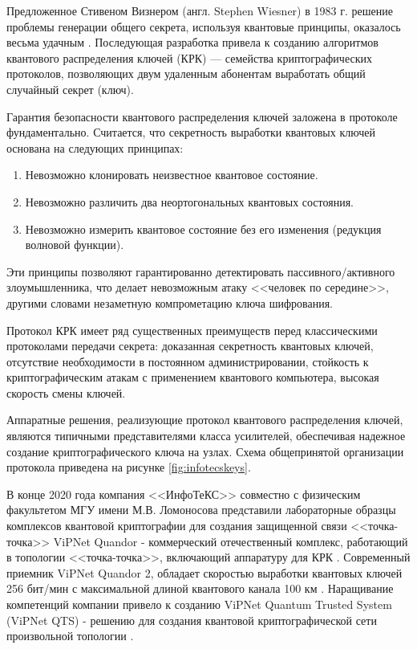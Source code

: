\documentclass[a4paper,12pt]{article}
\begin{document}
Предложенное Стивеном Визнером (англ. Stephen Wiesner) в 1983 г. решение проблемы генерации общего секрета, используя квантовые принципы, оказалось весьма удачным \cite{Stephen_Wiesner}. Последующая разработка привела к созданию алгоритмов квантового распределения ключей (КРК) — семейства криптографических протоколов, позволяющих двум удаленным абонентам выработать общий случайный секрет (ключ). 

Гарантия безопасности квантового распределения ключей заложена в протоколе фундаментально. Считается, что секретность выработки квантовых ключей основана на следующих принципах:

\begin{enumerate}
	\item Невозможно клонировать неизвестное квантовое состояние.
	\item Невозможно различить два неортогональных квантовых состояния.
	\item Невозможно измерить квантовое состояние без его изменения (редукция волновой функции).
\end{enumerate}

Эти принципы позволяют гарантированно детектировать пассивного/активного злоумышленника, что делает невозможным атаку <<человек по середине>>, другими словами незаметную компрометацию ключа шифрования.

Протокол КРК имеет ряд существенных преимуществ перед классическими протоколами передачи секрета: доказанная секретность квантовых ключей, отсутствие необходимости в постоянном администрировании, стойкость к криптографическим атакам с применением квантового компьютера, высокая скорость смены ключей.

Аппаратные решения, реализующие протокол квантового распределения ключей, являются типичными представителями класса усилителей, обеспечивая надежное создание криптографического ключа на узлах. Схема общепринятой организации протокола приведена на рисунке \ref{fig:infotecskeys}. 


В конце 2020 года компания <<ИнфоТеКС>> совместно с физическим факультетом МГУ имени М.В. Ломоносова представили лабораторные образцы комплексов квантовой криптографии для создания защищенной связи <<точка-точка>> ViPNet Quandor - коммерческий отечественный комплекс, работающий в топологии <<точка-точка>>, включающий аппаратуру для КРК \cite{Infotect_ViPNet1_MSU}. Современный приемник ViPNet Quandor 2, обладает скоростью выработки квантовых ключей 256 бит/мин с максимальной длиной квантового канала 100 км \cite{Infotect_ViPNet2}. Наращивание компетенций компании привело к созданию ViPNet Quantum Trusted System (ViPNet QTS) - решению для создания квантовой криптографической сети произвольной топологии \cite{Infotect_QTS}.
\end{document}
